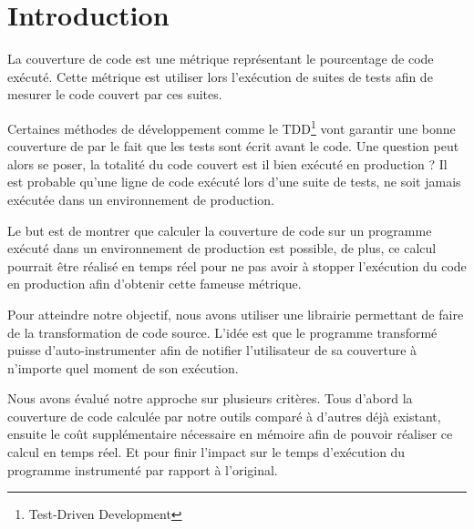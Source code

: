 \chapter*{Introduction}
	\thispagestyle{introduction}

La couverture de code est une métrique représentant le pourcentage de code exécuté. Cette métrique est utiliser lors l'exécution de suites de tests afin de mesurer le code couvert par ces suites. 

Certaines méthodes de développement comme le TDD\footnote{Test-Driven Development} vont garantir une bonne couverture de par le fait que les tests sont écrit avant le code. Une question peut alors se poser, la totalité du code couvert est il bien exécuté en production ? Il est probable qu’une ligne de code exécuté lors d’une suite de tests, ne soit jamais exécutée dans un environnement de production. 

Le but est de montrer que calculer la couverture de code sur un programme exécuté dans un environnement de production est possible, de plus, ce calcul pourrait être réalisé en temps réel pour ne pas avoir à stopper l’exécution du code en production afin d’obtenir cette fameuse métrique.

Pour atteindre notre objectif, nous avons utiliser une librairie permettant de faire de la transformation de code source. L’idée est que le programme transformé puisse d’auto-instrumenter afin de notifier l’utilisateur de sa couverture à n'importe quel moment de son exécution.

Nous avons évalué notre approche sur plusieurs critères. Tous d’abord la couverture de code calculée par notre outils comparé à d’autres déjà existant, ensuite le coût supplémentaire nécessaire en mémoire afin de pouvoir réaliser ce calcul en temps réel. Et pour finir l’impact sur le temps d’exécution du programme instrumenté par rapport à l’original.

